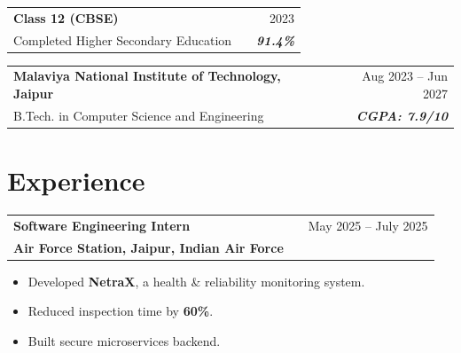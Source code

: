 \documentclass[a4paper,10pt]{article}
\begin{document}
\begin{tabularx}{\linewidth}{ @{}l X r@{} }

{\color[HTML]{1C033C} \textbf{Class 12 (CBSE)}} & \hfill & {\color[HTML]{371e77} 2023} \\

{\color[HTML]{371e77} Completed Higher Secondary Education} & \hfill & {\color[HTML]{4B28A4} \textit{\textbf{91.4\%}}} \\

\end{tabularx}



\vspace{-2pt}



\begin{tabularx}{\linewidth}{ @{}l X r@{} }

{\color[HTML]{1C033C} \textbf{Malaviya National Institute of Technology, Jaipur}} & \hfill & {\color[HTML]{371e77} Aug 2023 -- Jun 2027} \\

{\color[HTML]{371e77} B.Tech. in Computer Science and Engineering} & \hfill & {\color[HTML]{4B28A4} \textit{\textbf{CGPA: 7.9/10}}} \\

\end{tabularx}




\section{Experience}



\begin{tabularx}{\linewidth}{ @{}l X r@{} }

\textbf{Software Engineering Intern} & \hfill & {\color[HTML]{371e77} May 2025 -- July 2025} \\

{\color[HTML]{371e77} \textbf{Air Force Station, Jaipur, Indian Air Force}} & & \\

\end{tabularx}



\vspace{-6pt}

\begin{itemize}[nosep, leftmargin=1.5em]

\item Developed \textbf{NetraX}, a health \& reliability monitoring system.

\item Reduced inspection time by \textbf{60\%}.

\item Built secure microservices backend.

\end{itemize}
\end{document}

